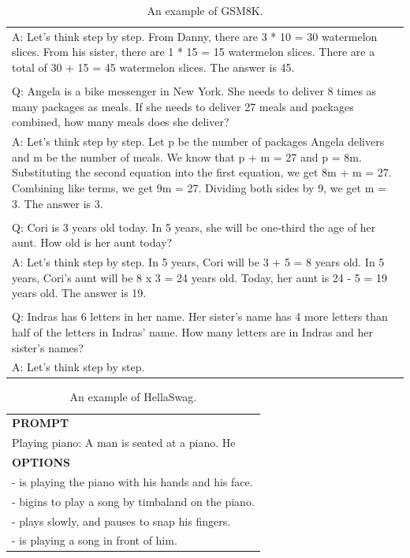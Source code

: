 \begin{table}[h]
\begin{tabular}{p{13cm}}
\\A: Let's think step by step. From Danny, there are 3 * 10 = 30 watermelon slices. From his sister, there are 1 * 15 = 15 watermelon slices. There are a total of 30 + 15 = 45 watermelon slices. The answer is 45.
\\
\\Q: Angela is a bike messenger in New York. She needs to deliver 8 times as many packages as meals. If she needs to deliver 27 meals and packages combined, how many meals does she deliver?
\\A: Let's think step by step. Let p be the number of packages Angela delivers and m be the number of meals. We know that p + m = 27 and p = 8m. Substituting the second equation into the first equation, we get 8m + m = 27. Combining like terms, we get 9m = 27. Dividing both sides by 9, we get m = 3. The answer is 3.
\\
\\Q: Cori is 3 years old today. In 5 years, she will be one-third the age of her aunt. How old is her aunt today?
\\A: Let's think step by step. In 5 years, Cori will be 3 + 5 = 8 years old. In 5 years, Cori’s aunt will be 8 x 3 = 24 years old. Today, her aunt is 24 - 5 = 19 years old. The answer is 19.
\\
\\Q: Indras has 6 letters in her name. Her sister's name has 4 more letters than half of the letters in Indras' name. How many letters are in Indras and her sister's names?
\\A: Let's think step by step.\\
\bottomrule
\end{tabular}
    \caption{\centering An example of GSM8K.}
    \label{tab:gsm8k_eval_format_example}
\end{table}


\begin{table}[h]
    \centering \small
\begin{tabular}{p{12cm}}
\toprule
\textbf{PROMPT}\\
Playing piano: A man is seated at a piano. He\\
\midrule
\textbf{OPTIONS}\\
- is playing the piano with his hands and his face.\\
- bigins to play a song by timbaland on the piano.\\
- plays slowly, and pauses to snap his fingers.\\
- is playing a song in front of him.\\
\bottomrule
\end{tabular}
    \caption{\centering An example of HellaSwag.}
    \label{tab:hellaswag_eval_format_example}
\end{table}

